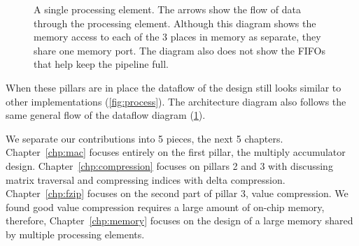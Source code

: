 \begin{figure}
\begin{tikzpicture}[scale=1]
\end{tikzpicture}
\caption[Diagram of a single processing element]{A single processing element. The arrows show the flow of data through the processing element. Although this diagram shows the memory access to each of the 3 places in memory as separate, they share one memory port. The diagram also does not show the FIFOs that help keep the pipeline full.}
\label{fig:SpMV}
\end{figure}%
%
When these pillars are in place the dataflow of the design still looks similar to other implementations (\figurename \ref{fig:process}). The architecture diagram also follows the same general flow of the dataflow diagram (\figurename \ref{fig:SpMV}).
\par We separate our contributions into 5 pieces, the next 5 chapters. Chapter~\ref{chp:mac} focuses entirely on the first pillar, the multiply accumulator design. Chapter~\ref{chp:compression} focuses on pillars 2 and 3 with discussing matrix traversal and compressing indices with delta compression. Chapter~\ref{chp:fzip} focuses on the second part of pillar 3, value compression. We found good value compression requires a large amount of on-chip memory, therefore, Chapter~\ref{chp:memory} focuses on the design of a large memory shared by multiple processing elements.

